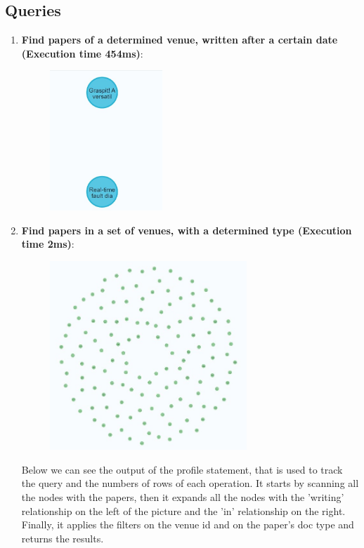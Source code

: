 \documentclass{Configuration_Files/PoliMi3i_thesis}
\begin{document}
\subsection{Queries}
\begin{enumerate}
    \item \textbf{Find papers of a determined venue, written after a certain date (Execution time 454ms)}:
    
     \begin{figure}[H]
    \centering
    \includegraphics[width=0.4\textwidth]{Images/queries_neo4j/query_1.jpg}\end{figure}
    \item \textbf{Find papers in a set of venues, with a determined type (Execution time 2ms)}:
    
     \begin{figure}[H]
    \centering
    \includegraphics[width=0.7\textwidth]{Images/queries_neo4j/query_2.jpg}
    \end{figure}
  Below we can see the output of the profile statement, that is used to track the query and the numbers of rows of each operation. It starts by scanning all the nodes with the papers, then it expands all the nodes with the 'writing' relationship on the left of the picture and the 'in' relationship on the right. Finally, it applies the filters on the venue id and on the paper's doc type and returns the results.

\end{enumerate}
\end{document}
